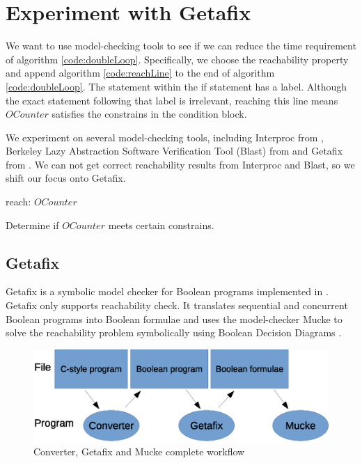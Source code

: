 \chapter{Experiment with Getafix}
	\label{CH_03}

We want to use model-checking tools to see if we can reduce the time requirement of algorithm \ref{code:doubleLoop}. Specifically, we choose the reachability property and append algorithm \ref{code:reachLine} to the end of algorithm \ref{code:doubleLoop}. The statement within the if statement has a label. Although the exact statement following that label is irrelevant, reaching this line means $OCounter$ satisfies the constrains in the condition block.

We experiment on several model-checking tools, including Interproc from \cite{_interproc_2011}, Berkeley Lazy Abstraction Software Verification Tool (Blast) from \cite{_mtc_2008} and Getafix from \cite{la_torre_analyzing_2009}. We can not get correct reachability results from Interproc and Blast, so we shift our focus onto Getafix.

\renewcommand{\algorithmiccomment}[1]{// #1}
\begin{algorithm}
\begin{algorithmic}

\STATE reach: $OCounter$
\ENDIF

\end{algorithmic}

\caption[Single loop]{Determine if $OCounter$ meets certain constrains.}
\label{code:reachLine}
\end{algorithm}

\section{Getafix}
Getafix is a symbolic model checker for Boolean programs implemented in \cite{la_torre_analyzing_2009}. Getafix only supports reachability check. It translates sequential and concurrent Boolean programs into Boolean formulae and uses the model-checker Mucke to solve the reachability problem symbolically using Boolean Decision Diagrams \cite{_getafix_2009}. 

\begin{figure}
\centering
\caption{Converter, Getafix and Mucke complete workflow}
\label{fig:workFlow}
\includegraphics[scale=0.8]{Figures/workFlow}
\end{figure}

